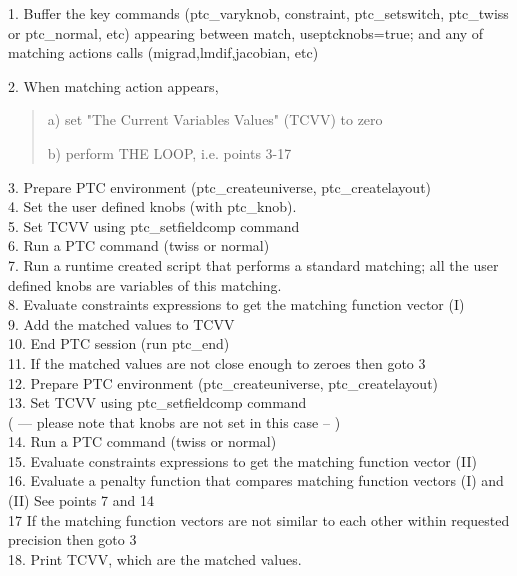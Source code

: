   1. Buffer the key commands (ptc\_varyknob, constraint, ptc\_setswitch, ptc\_twiss or ptc\_normal, etc)  appearing between  match, useptcknobs=true; and any of matching actions calls (migrad,lmdif,jacobian, etc)
  
  2.  When matching action appears,  
\\
\begin{quotation}
      a) set "The Current Variables Values" (TCVV) to zero
      
      b) perform THE LOOP, i.e. points 3-17 
\\
\end{quotation}
 3.  Prepare PTC environment (ptc\_createuniverse, ptc\_createlayout) 
\\ 4.  Set the user defined knobs (with ptc\_knob). 
\\ 5.  Set TCVV using ptc\_setfieldcomp command 
\\ 6.  Run a PTC command (twiss or normal) 
\\ 7.  Run a runtime created script that performs a standard matching;     all the user defined knobs are variables of this matching. 
\\ 8.  Evaluate constraints expressions to get the matching function vector (I) 
\\ 9.  Add the matched values to TCVV 
\\ 10. End PTC session (run ptc\_end) 
\\ 11. If the matched values are not close enough to zeroes then goto 3 
\\ 12. Prepare PTC environment (ptc\_createuniverse, ptc\_createlayout) 
\\ 13. Set TCVV using ptc\_setfieldcomp command 
\\   ( --- please note that knobs are not set in this case  -- ) 
\\ 14. Run a PTC command (twiss or normal)  
\\ 15. Evaluate constraints expressions to get the matching function vector (II) 
\\ 16. Evaluate a penalty function that compares matching function vectors (I) and (II)     See points 7 and 14 
\\ 17  If the matching function vectors are not similar to each other      within requested precision then goto 3 
\\ 18. Print TCVV, which are the matched values. 
\\


